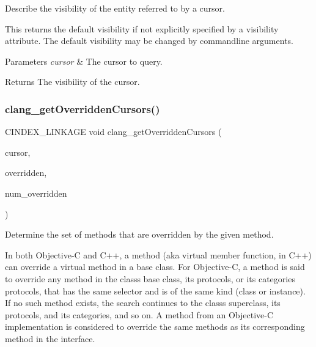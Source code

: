 Describe the visibility of the entity referred to by a cursor. 

This returns the default visibility if not explicitly specified by a visibility attribute. The default visibility may be changed by commandline arguments.


\begin{DoxyParams}{Parameters}
{\em cursor} & The cursor to query.\\
\hline
\end{DoxyParams}
\begin{DoxyReturn}{Returns}
The visibility of the cursor. 
\end{DoxyReturn}
\mbox{\label{group__CINDEX__CURSOR__MANIP_gac308b03420c550e00c61153dc63deac8}} 
\subsubsection{\texorpdfstring{clang\+\_\+get\+Overridden\+Cursors()}{clang\_getOverriddenCursors()}}
{\footnotesize\ttfamily C\+I\+N\+D\+E\+X\+\_\+\+L\+I\+N\+K\+A\+GE void clang\+\_\+get\+Overridden\+Cursors (\begin{DoxyParamCaption}\item[{\hyperlink{structCXCursor}{C\+X\+Cursor}}]{cursor,  }\item[{\hyperlink{structCXCursor}{C\+X\+Cursor} $\ast$$\ast$}]{overridden,  }\item[{unsigned $\ast$}]{num\+\_\+overridden }\end{DoxyParamCaption})}



Determine the set of methods that are overridden by the given method. 

In both Objective-\/C and C++, a method (aka virtual member function, in C++) can override a virtual method in a base class. For Objective-\/C, a method is said to override any method in the class\textquotesingle{}s base class, its protocols, or its categories\textquotesingle{} protocols, that has the same selector and is of the same kind (class or instance). If no such method exists, the search continues to the class\textquotesingle{}s superclass, its protocols, and its categories, and so on. A method from an Objective-\/C implementation is considered to override the same methods as its corresponding method in the interface.

